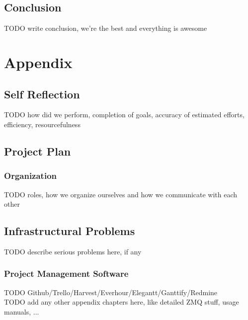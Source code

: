 \documentclass[a4paper]{report}
\begin{document}
\chapter{Conclusion}
TODO write conclusion, we're the best and everything is awesome

\printbibliography

\appendix
\part{Appendix}
\chapter{Self Reflection}
TODO how did we perform, completion of goals, accuracy of estimated efforts, efficiency, resourcefulness

\chapter{Project Plan}

\section{Organization}
TODO roles, how we organize ourselves and how we communicate with each other

\chapter{Infrastructural Problems}\label{ch:problems}
TODO describe serious problems here, if any

\section{Project Management Software}
TODO Github/Trello/Harvest/Everhour/Elegantt/Ganttify/Redmine\\

TODO add any other appendix chapters here, like detailed ZMQ stuff, usage manuals, ...\\
\end{document}
